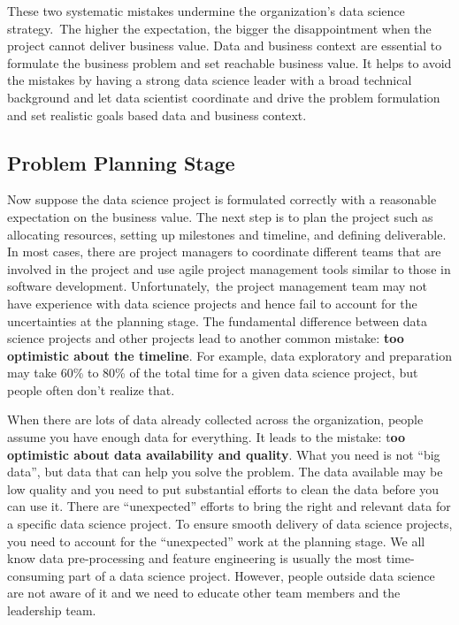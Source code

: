 \documentclass[12pt,]{krantz}
\theoremstyle{definition}
\theoremstyle{definition}
\theoremstyle{definition}
\theoremstyle{remark}
\begin{document}
These two systematic mistakes undermine the organization's data science
strategy.~The higher the expectation, the bigger the disappointment when
the project cannot deliver business value. Data and business context are
essential to formulate the business problem and set reachable business
value. It helps to avoid the mistakes by having a strong data science
leader with a broad technical background and let data scientist
coordinate and drive the problem formulation and set realistic goals
based data and business context.

\subsection{Problem Planning Stage}\label{problem-planning-stage}

Now suppose the data science project is formulated correctly with a
reasonable expectation on the business value. The next step is to plan
the project such as allocating resources, setting up milestones and
timeline, and defining deliverable. In most cases, there are project
managers to coordinate different teams that are involved in the project
and use agile project management tools similar to those in software
development. Unfortunately,~the project management team may not have
experience with data science projects and hence fail to account for the
uncertainties at the planning stage. The fundamental difference between
data science projects and other projects lead to another common mistake:
\textbf{too optimistic about the timeline}. For example, data
exploratory and preparation may take 60\% to 80\% of the total time for
a given data science project, but people often don't realize that.

When there are lots of data already collected across the organization,
people assume you have enough data for everything. It leads to the
mistake: t\textbf{oo optimistic about data availability and quality}.
What you need is not ``big data'', but data that can help you solve the
problem. The data available may be low quality and you need to put
substantial efforts to clean the data before you can use it. There are
``unexpected'' efforts to bring the right and relevant data for a
specific data science project. To ensure smooth delivery of data science
projects, you need to account for the ``unexpected'' work at the
planning stage. We all know data pre-processing and feature engineering
is usually the most time-consuming part of a data science project.
However, people outside data science are not aware of it and we need to
educate other team members and the leadership team.
\end{document}
